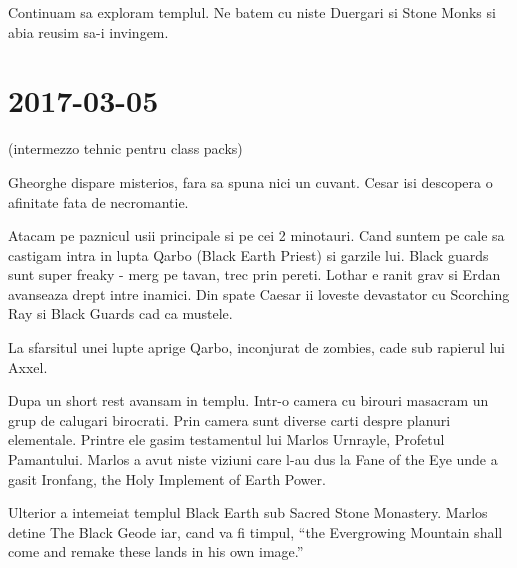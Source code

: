 \documentclass[12pt,oneside]{book}
\begin{document}
Continuam sa exploram templul. Ne batem cu niste Duergari si Stone Monks si abia reusim sa-i invingem.

\section{2017-03-05}

(intermezzo tehnic pentru class packs)

Gheorghe dispare misterios, fara sa spuna nici un cuvant. Cesar isi descopera o afinitate fata de necromantie.

Atacam pe paznicul usii principale si pe cei 2 minotauri. Cand suntem pe cale sa castigam intra in lupta Qarbo (Black Earth Priest)
si garzile lui. Black guards sunt super freaky - merg pe tavan, trec prin pereti. Lothar e ranit grav si Erdan avanseaza drept intre
inamici. Din spate Caesar ii loveste devastator cu Scorching Ray si Black Guards cad ca mustele.

La sfarsitul unei lupte aprige Qarbo, inconjurat de zombies, cade sub rapierul lui Axxel.

Dupa un short rest avansam in templu. Intr-o camera cu birouri masacram un grup de calugari birocrati.
Prin camera sunt diverse carti despre planuri elementale. Printre ele gasim testamentul lui 
Marlos Urnrayle, Profetul Pamantului. Marlos a avut niste viziuni care l-au dus la Fane of the Eye 
unde a gasit Ironfang, the Holy Implement of Earth Power. 

Ulterior a intemeiat templul Black Earth sub Sacred Stone Monastery. Marlos detine The Black Geode iar, cand va fi timpul, ``the Evergrowing Mountain shall come and remake these lands in his own image.''
\end{document}
